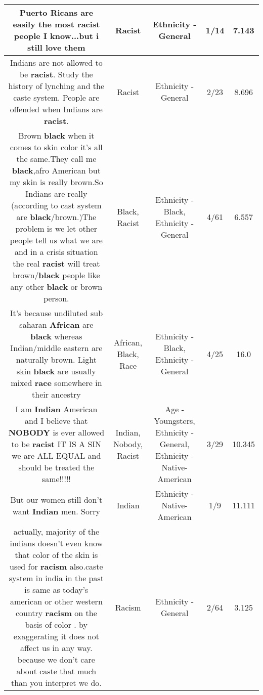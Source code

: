 \documentclass[11pt]{article}
\newlength\mylength
\begin{document}
\begin{center}
\begin{longtable}{|C{.65\mylength}|C{.30\mylength}|C{.12\mylength}|C{.12\mylength}|C{.12\mylength}|}
  \small Puerto Ricans are easily the most \textbf{racist} people I know...but i still love them\normalsize   & Racist & Ethnicity - General & 1/14 & 7.143 \\  \hline
  \small Indians are not allowed to be \textbf{racist}. Study the history of lynching and the caste system. People are offended when Indians are \textbf{racist}.\normalsize   & Racist & Ethnicity - General & 2/23 & 8.696 \\  \hline
  \small Brown \textbf{black} when it comes to skin color it's all the same.They call me \textbf{black},afro American but my skin is really brown.So Indians are really (according to cast system are \textbf{black}/brown.)The problem is we let other people tell us what we are and in a crisis situation the real \textbf{racist} will treat brown/\textbf{black} people like any other \textbf{black} or brown person.\normalsize   & Black, Racist & Ethnicity - Black, Ethnicity - General & 4/61 & 6.557 \\  \hline
  \small It's because undiluted sub saharan \textbf{African} are \textbf{black} whereas Indian/middle eastern are naturally brown. Light skin \textbf{black} are usually mixed \textbf{race} somewhere in their ancestry\normalsize   & African, Black, Race & Ethnicity - Black, Ethnicity - General & 4/25 & 16.0 \\  \hline
  \small I am \textbf{Indian} American and I believe that \textbf{NOBODY} is ever allowed to be \textbf{racist} IT IS A SIN we are ALL EQUAL and should be treated the same!!!!!\normalsize   & Indian, Nobody, Racist & Age - Youngsters, Ethnicity - General, Ethnicity - Native-American & 3/29 & 10.345 \\  \hline
  \small But our women still don't want \textbf{Indian} men. Sorry\normalsize   & Indian & Ethnicity - Native-American & 1/9 & 11.111 \\  \hline
  \small actually, majority of the indians doesn't even know that color of the skin is used for \textbf{racism} also.caste system in india in the past is same as  today's american or other western country  \textbf{racism} on the basis of color . by exaggerating it does not affect us in any way. because we don't care about caste that much than you interpret we do.\normalsize   & Racism & Ethnicity - General & 2/64 & 3.125 \\  \hline

\end{longtable}
\end{center}
\end{document}
